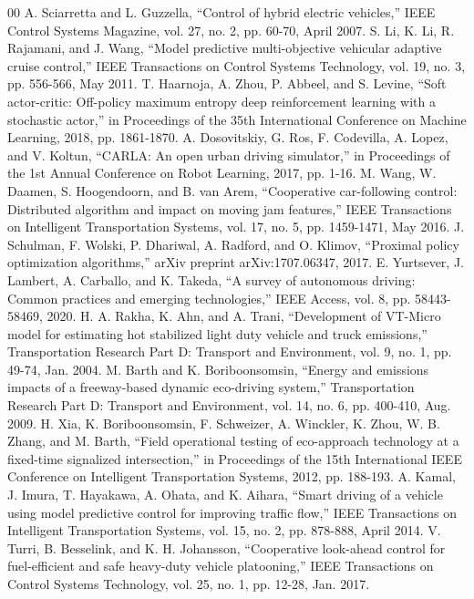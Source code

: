 \documentclass[conference,onecolumn,draftclsnofoot]{IEEEtran}
\begin{document}
\begin{thebibliography}{00}
 A. Sciarretta and L. Guzzella, ``Control of hybrid electric vehicles,'' IEEE Control Systems Magazine, vol. 27, no. 2, pp. 60-70, April 2007.
 S. Li, K. Li, R. Rajamani, and J. Wang, ``Model predictive multi-objective vehicular adaptive cruise control,'' IEEE Transactions on Control Systems Technology, vol. 19, no. 3, pp. 556-566, May 2011.
 T. Haarnoja, A. Zhou, P. Abbeel, and S. Levine, ``Soft actor-critic: Off-policy maximum entropy deep reinforcement learning with a stochastic actor,'' in Proceedings of the 35th International Conference on Machine Learning, 2018, pp. 1861-1870.
 A. Dosovitskiy, G. Ros, F. Codevilla, A. Lopez, and V. Koltun, ``CARLA: An open urban driving simulator,'' in Proceedings of the 1st Annual Conference on Robot Learning, 2017, pp. 1-16.
 M. Wang, W. Daamen, S. Hoogendoorn, and B. van Arem, ``Cooperative car-following control: Distributed algorithm and impact on moving jam features,'' IEEE Transactions on Intelligent Transportation Systems, vol. 17, no. 5, pp. 1459-1471, May 2016.
 J. Schulman, F. Wolski, P. Dhariwal, A. Radford, and O. Klimov, ``Proximal policy optimization algorithms,'' arXiv preprint arXiv:1707.06347, 2017.
 E. Yurtsever, J. Lambert, A. Carballo, and K. Takeda, ``A survey of autonomous driving: Common practices and emerging technologies,'' IEEE Access, vol. 8, pp. 58443-58469, 2020.
 H. A. Rakha, K. Ahn, and A. Trani, ``Development of VT-Micro model for estimating hot stabilized light duty vehicle and truck emissions,'' Transportation Research Part D: Transport and Environment, vol. 9, no. 1, pp. 49-74, Jan. 2004.
 M. Barth and K. Boriboonsomsin, ``Energy and emissions impacts of a freeway-based dynamic eco-driving system,'' Transportation Research Part D: Transport and Environment, vol. 14, no. 6, pp. 400-410, Aug. 2009.
 H. Xia, K. Boriboonsomsin, F. Schweizer, A. Winckler, K. Zhou, W. B. Zhang, and M. Barth, ``Field operational testing of eco-approach technology at a fixed-time signalized intersection,'' in Proceedings of the 15th International IEEE Conference on Intelligent Transportation Systems, 2012, pp. 188-193.
 A. Kamal, J. Imura, T. Hayakawa, A. Ohata, and K. Aihara, ``Smart driving of a vehicle using model predictive control for improving traffic flow,'' IEEE Transactions on Intelligent Transportation Systems, vol. 15, no. 2, pp. 878-888, April 2014.
 V. Turri, B. Besselink, and K. H. Johansson, ``Cooperative look-ahead control for fuel-efficient and safe heavy-duty vehicle platooning,'' IEEE Transactions on Control Systems Technology, vol. 25, no. 1, pp. 12-28, Jan. 2017.

\end{thebibliography}
\end{document}
